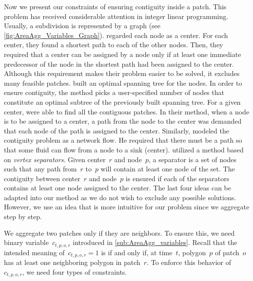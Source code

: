 Now we present our constraints of 
ensuring contiguity inside a patch.
This problem has received considerable attention 
in integer linear programming.
Usually, a subdivision is represented by a graph
(see \fig\ref{fig:AreaAgg_Variables_Graph}).
%
\textcite{Zoltners1983Territory} regarded each node as a center.
For each center, they found a shortest path 
to each of the other nodes.
Then, they required that a center can be assigned 
by a node only if 
at least one immediate predecessor of the node 
in the shortest path had been assigned to the center.
Although this requirement makes 
their problem easier to be solved,
it excludes many feasible patches.
%
\textcite{Williams2002Contiguous} 
built an optimal spanning tree for the nodes.
In order to ensure contiguity, 
the method picks a user-specified number of nodes that constitute 
an optimal subtree of the previously built spanning tree.
%
For a given center, \textcite{Cova2000_Contiguity} 
were able to find all the contiguous patches.
In their method, when a node is to be assigned to a center, 
a path from the node to the center was demanded 
that each node of the path is assigned to the center.
%
Similarly, \textcite{Shirabe2005Contiguity} modeled 
the contiguity problem as a network flow.
He required that there must be a path so that 
some fluid can flow from a node to a sink (center).
%
\textcite{Oehrlein2017Aggregation} utilized a method based 
on \emph{vertex separators}.	
Given center~$r$ and node~$p$, 
a separator is a set of nodes
such that any path from~$r$ to~$p$ 
will contain at least one node of the set.
The contiguity between center~$r$ and node~$p$ is ensured 
if each of the separators contains 
at least one node assigned to the center.
%
The last four ideas can be adapted into our method
as we do not wish to exclude any possible solutions.
However, we use an idea
that is more intuitive for our problem
since we aggregate step by step.


We aggregate two patches only if they are neighbors.
To ensure this, we need binary variable~$c_{t,p,o,r}$
introduced in \sect\ref{sub:AreaAgg_variables}.
Recall that the intended meaning of~$c_{t,p,o,r}=1$ 
is if and only if, at time~$t$, 
polygon~$p$ of patch~$o$ has 
at least one neighboring polygon in patch~$r$.
To enforce this behavior of~$c_{t,p,o,r}$, 
we need four types of constraints.


